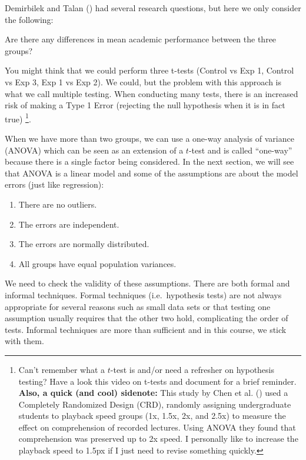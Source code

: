 \documentclass[
  letterpaper,
]{book}
\providecommand{\tightlist}{%
  \setlength{\itemsep}{0pt}\setlength{\parskip}{0pt}}\usepackage{longtable,booktabs,array}
\begin{document}
Demirbilek and Talan () had several
research questions, but here we only consider the following:

Are there any differences in mean academic performance between the three
groups?

You might think that we could perform three t-tests (Control vs Exp 1,
Control vs Exp 3, Exp 1 vs Exp 2). We could, but the problem with this
approach is what we call multiple testing. When conducting many tests,
there is an increased risk of making a Type 1 Error (rejecting the null
hypothesis when it is in fact true) \footnote{Can't remember what a
  \(t\)-test is and/or need a refresher on hypothesis testing? Have a
  look this video on t-tests and document for a brief reminder.
  \textbf{Also, a quick (and cool) sidenote:} This study by Chen et al.
  () used a Completely Randomized
  Design (CRD), randomly assigning undergraduate students to playback
  speed groups (1x, 1.5x, 2x, and 2.5x) to measure the effect on
  comprehension of recorded lectures. Using ANOVA they found that
  comprehension was preserved up to 2x speed. I personally like to
  increase the playback speed to 1.5px if I just need to revise
  something quickly.}.

When we have more than two groups, we can use a one-way analysis of
variance (ANOVA) which can be seen as an extension of a \(t\)-test and
is called ``one-way'' because there is a single factor being considered.
In the next section, we will see that ANOVA is a linear model and some
of the assumptions are about the model errors (just like regression):

\begin{enumerate}
\def\labelenumi{\arabic{enumi}.}
\tightlist
\item
  There are no outliers.
\item
  The errors are independent.
\item
  The errors are normally distributed.
\item
  All groups have equal population variances.
\end{enumerate}

We need to check the validity of these assumptions. There are both
formal and informal techniques. Formal techniques (i.e.~hypothesis
tests) are not always appropriate for several reasons such as small data
sets or that testing one assumption usually requires that the other two
hold, complicating the order of tests. Informal techniques are more than
sufficient and in this course, we stick with them.
\end{document}
